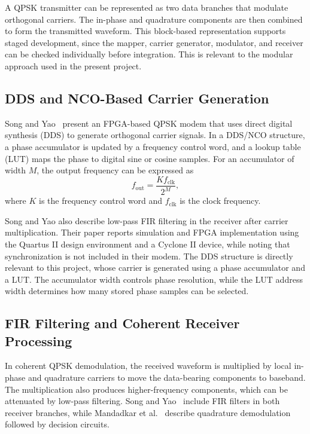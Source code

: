 \documentclass[10pt,twocolumn,letterpaper]{article}
\begin{document}
A QPSK transmitter can be represented as two data branches that modulate orthogonal carriers. The in-phase and quadrature components are then combined to form the transmitted waveform. This block-based representation supports staged development, since the mapper, carrier generator, modulator, and receiver can be checked individually before integration. This is relevant to the modular approach used in the present project.

\subsection{DDS and NCO-Based Carrier Generation}
Song and Yao~\cite{song2010qpsk} present an FPGA-based QPSK modem that uses direct digital synthesis (DDS) to generate orthogonal carrier signals. In a DDS/NCO structure, a phase accumulator is updated by a frequency control word, and a lookup table (LUT) maps the phase to digital sine or cosine samples. For an accumulator of width $M$, the output frequency can be expressed as
\begin{equation}
 f_{\mathrm{out}}=\frac{K f_{\mathrm{clk}}}{2^M},
 \label{eq:dds_frequency}
\end{equation}
where $K$ is the frequency control word and $f_{\mathrm{clk}}$ is the clock frequency.

Song and Yao also describe low-pass FIR filtering in the receiver after carrier multiplication. Their paper reports simulation and FPGA implementation using the Quartus II design environment and a Cyclone II device, while noting that synchronization is not included in their modem. The DDS structure is directly relevant to this project, whose carrier is generated using a phase accumulator and a LUT. The accumulator width controls phase resolution, while the LUT address width determines how many stored phase samples can be selected.

\subsection{FIR Filtering and Coherent Receiver Processing}
In coherent QPSK demodulation, the received waveform is multiplied by local in-phase and quadrature carriers to move the data-bearing components to baseband. The multiplication also produces higher-frequency components, which can be attenuated by low-pass filtering. Song and Yao~\cite{song2010qpsk} include FIR filters in both receiver branches, while Mandadkar et al.~\cite{mandadkar2014qpsk} describe quadrature demodulation followed by decision circuits.
\end{document}
